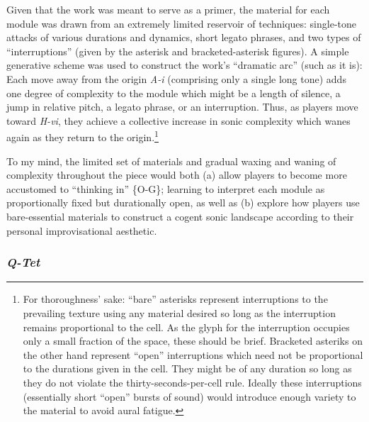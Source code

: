     Given that the work was meant to serve as a primer, the material for each module was drawn from an extremely limited reservoir of techniques: single-tone attacks of various durations and dynamics, short legato phrases, and two types of ``interruptions'' (given by the asterisk and bracketed-asterisk figures). A simple generative scheme was used to construct the work's ``dramatic arc'' (such as it is): Each move away from the origin \textit{A-i} (comprising only a single long tone) adds one degree of complexity to the module which might be a length of silence, a jump in relative pitch, a legato phrase, or an interruption. Thus, as players move toward \textit{H-vi}, they achieve a collective increase in sonic complexity which wanes again as they return to the origin.\footnote{For thoroughness' sake: ``bare'' asterisks represent interruptions to the prevailing texture using any material desired so long as the interruption remains proportional to the cell. As the glyph for the interruption occupies only a small fraction of the space, these should be brief. Bracketed asteriks on the other hand represent ``open'' interruptions which need not be proportional to the durations given in the cell. They might be of any duration so long as they do not violate the thirty-seconds-per-cell rule. Ideally these interruptions (essentially short ``open'' bursts of sound) would introduce enough variety to the material to avoid aural fatigue.} 
    
    To my mind, the limited set of materials and gradual waxing and waning of complexity throughout the piece would both (a) allow players to become more accustomed to ``thinking in'' \{O-G\}; learning to interpret each module as proportionally fixed but durationally open, as well as (b) explore how players use bare-essential materials to construct a cogent sonic landscape according to their personal improvisational aesthetic.

    \subsubsection{\textit{Q-Tet}}

